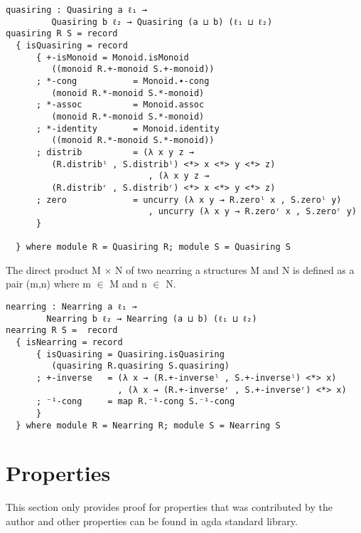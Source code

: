 \begin{Verbatim}
quasiring : Quasiring a ℓ₁ →
		 Quasiring b ℓ₂ → Quasiring (a ⊔ b) (ℓ₁ ⊔ ℓ₂)
quasiring R S = record
  { isQuasiring = record
      { +-isMonoid = Monoid.isMonoid
		 ((monoid R.+-monoid S.+-monoid))
      ; *-cong           = Monoid.∙-cong
		 (monoid R.*-monoid S.*-monoid)
      ; *-assoc          = Monoid.assoc
		 (monoid R.*-monoid S.*-monoid)
      ; *-identity       = Monoid.identity
		 ((monoid R.*-monoid S.*-monoid))
      ; distrib          = (λ x y z →
		 (R.distribˡ , S.distribˡ) <*> x <*> y <*> z)
                            , (λ x y z →
		 (R.distribʳ , S.distribʳ) <*> x <*> y <*> z)
      ; zero             = uncurry (λ x y → R.zeroˡ x , S.zeroˡ y)
                            , uncurry (λ x y → R.zeroʳ x , S.zeroʳ y)
      }

  } where module R = Quasiring R; module S = Quasiring S
\end{Verbatim}
The direct product M \(\times\) N of two nearring a structures M and N is defined as a pair (m,n) where m \(\in\) M and n \(\in\) N.
\begin{Verbatim}
nearring : Nearring a ℓ₁ → 
		Nearring b ℓ₂ → Nearring (a ⊔ b) (ℓ₁ ⊔ ℓ₂)
nearring R S =  record
  { isNearring = record
      { isQuasiring = Quasiring.isQuasiring
		 (quasiring R.quasiring S.quasiring)
      ; +-inverse   = (λ x → (R.+-inverseˡ , S.+-inverseˡ) <*> x)
                      , (λ x → (R.+-inverseʳ , S.+-inverseʳ) <*> x)
      ; ⁻¹-cong     = map R.⁻¹-cong S.⁻¹-cong
      }
  } where module R = Nearring R; module S = Nearring S
\end{Verbatim}
\section{Properties}
This section only provides proof for properties that was contributed by the author and other properties can be found in agda standard library.

